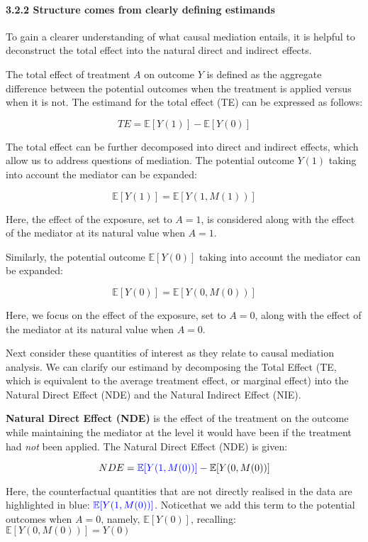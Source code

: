 \documentclass[
  singlecolumn]{article}
\let\oldparagraph\paragraph
\renewcommand{\paragraph}[1]{\oldparagraph{#1}\mbox{}}
\begin{document}
\paragraph{3.2.2 Structure comes from clearly defining
estimands}\label{structure-comes-from-clearly-defining-estimands}

To gain a clearer understanding of what causal mediation entails, it is
helpful to deconstruct the total effect into the natural direct and
indirect effects.

The total effect of treatment \(A\) on outcome \(Y\) is defined as the
aggregate difference between the potential outcomes when the treatment
is applied versus when it is not. The estimand for the total effect (TE)
can be expressed as follows:

\[
TE = \mathbb{E}[Y(1)] - \mathbb{E}[Y(0)]
\]

The total effect can be further decomposed into direct and indirect
effects, which allow us to address questions of mediation. The potential
outcome \(Y(1)\) taking into account the mediator can be expanded:

\[ 
\mathbb{E}[Y(1)] = \mathbb{E}[Y(1, M(1))]
\]

Here, the effect of the exposure, set to \(A = 1\), is considered along
with the effect of the mediator at its natural value when \(A = 1\).

Similarly, the potential outcome \(\mathbb{E}[Y(0)]\) taking into
account the mediator can be expanded:

\[ 
\mathbb{E}[Y(0)] = \mathbb{E}[Y(0, M(0))]
\]

Here, we focus on the effect of the exposure, set to \(A = 0\), along
with the effect of the mediator at its natural value when \(A = 0\).

Next consider these quantities of interest as they relate to causal
mediation analysis. We can clarify our estimand by decomposing the Total
Effect (TE, which is equivalent to the average treatment effect, or
marginal effect) into the Natural Direct Effect (NDE) and the Natural
Indirect Effect (NIE).

\textbf{Natural Direct Effect (NDE)} is the effect of the treatment on
the outcome while maintaining the mediator at the level it would have
been if the treatment had \emph{not} been applied. The Natural Direct
Effect (NDE) is given:

\[
 NDE = \textcolor{blue}{\mathbb{E}[Y(1, M(0))]} - \mathbb{E}[Y(0, M(0))]
 \]

Here, the counterfactual quantities that are not directly realised in
the data are highlighted in blue:
\(\textcolor{blue}{\mathbb{E}[Y(1, M(0))]}\). Noticethat we add this
term to the potential outcomes when \(A=0\), namely,
\(\mathbb{E}[Y(0)]\), recalling: \(\mathbb{E}[Y(0, M(0))] = Y(0)\)
\end{document}
